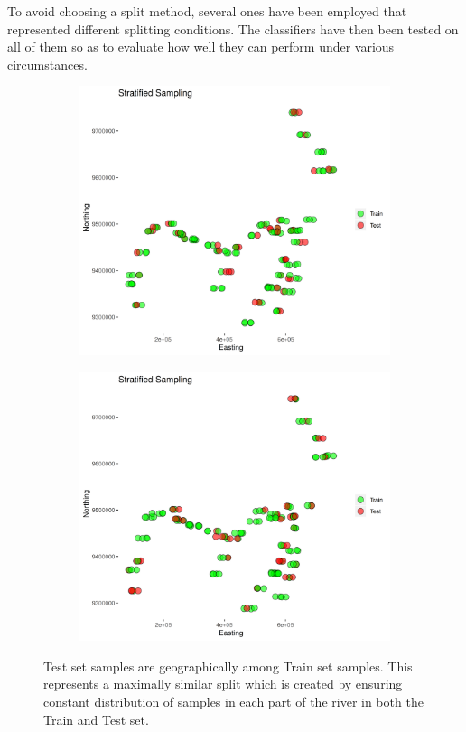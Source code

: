 To avoid choosing a split method, several ones have been employed that represented different splitting conditions. The classifiers have then been tested on all of them so as to evaluate how well they can perform under various circumstances.
\begin{figure}[h]
\centering
\begin{subfigure}{0.4\textwidth}
\includegraphics[width = \textwidth]{stratsamp.png}
\end{subfigure}
\begin{subfigure}{0.4\textwidth}
\includegraphics[width = \textwidth]{stratsamp2.png}
\end{subfigure}
\caption{Test set samples are geographically among Train set samples. This represents a maximally similar split which is created by ensuring constant distribution of samples in each part of the river in both the Train and Test set.}
\label{fig:stratsampl}
\end{figure}

